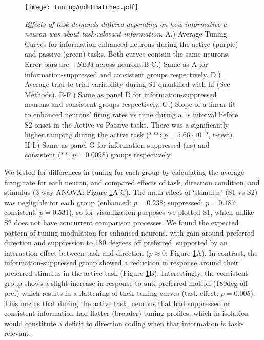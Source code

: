 \begin{figure}
	\centering
	\captionsetup{singlelinecheck = false, font=footnotesize, labelsep=space}
	\texttt{[image: tuningAndHFmatched.pdf]}
	\caption{{\it Effects of task demands differed depending on how informative a neuron was about task-relevant information.} A.) Average Tuning Curves for information-enhanced neurons during the active (purple) and passive (green) tasks. Both curves contain the same neurons. Error bars are $\pm SEM$ across neurons.B-C.) Same as A for information-suppressed and consistent groups respectively. D.) Average trial-to-trial variability during S1 quantified with \gls{hf} (See \hyperref[{sec:methods}]{Methods}). E-F.) Same as panel D for information-suppressed neurons and consistent groups respectively. G.) Slope of a linear fit to enhanced neurons' firing rates vs time during a 1s interval before S2 onset in the Active vs Passive tasks. There was a significantly higher ramping during the active task (***: $p=5.66\cdot10^{-5}$, t-test). H-I.) Same as panel G for information suppressed (ns) and consistent (**: $p=0.0098$) groups respectively.}
	\label{fig:interaction}
\end{figure}

We tested for differences in tuning for each group by calculating the average firing rate for each neuron, and compared effects of task, direction condition, and stimulus (3-way ANOVA: Figure \ref{fig:interaction}A-C). The main effect of `stimulus' (S1 vs S2) was negligible for each group (enhanced: $p=0.238$; suppressed: $p=0.187$; consistent: $p=0.531$), so for visualization purposes we plotted S1, which unlike S2 does not have concurrent comparison processes. We found the expected pattern of tuning modulation for enhanced neurons, with gain around preferred direction and suppression to 180 degrees off preferred, supported by an interaction effect between task and direction ($p \approx 0$: Figure \ref{fig:interaction}A). In contrast, the information-suppressed group showed a reduction in response around their preferred stimulus in the active task (Figure \ref{fig:interaction}B). Interestingly, the consistent group shows a slight increase in response to anti-preferred motion (180deg off pref) which results in a flattening of their tuning curves (task effect: $p=0.005$). This means that during the active task, neurons that had suppressed or consistent information  had flatter (broader) tuning profiles, which in isolation would constitute a deficit to direction coding when that information is task-relevant.

